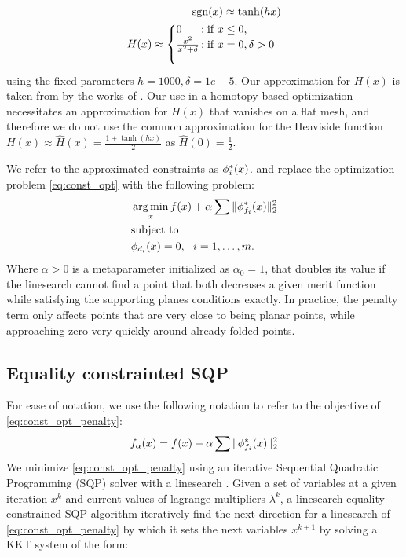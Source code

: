 \begin{align} 
\begin{split}\label{eq:const_inner}
\text{sgn}(x) \approx \tanh(hx) \\
H(x) \approx  \left\{\begin{array}{@{}l@{\thinspace}l}
0  &: \text{if } x \leq 0, \\
\frac{x^2}{x^2+\delta} &: \text{if } x = 0, \delta > 0 \\\\
\end{array}\right.
\end{split}
\end{align}
using the fixed parameters $h=1000,\delta = 1e-5$. Our approximation for $H(x)$ is taken from by the works of \cite{l0_approximation,autocuts}.  Our use in a homotopy based optimization necessitates an approximation for $H(x)$ that vanishes on a flat mesh, and therefore we do not use the common approximation for the Heaviside function $H(x) \approx \hat{H}(x) =  \frac{1+\tanh(hx)}{2}$ as $\hat H(0) = \frac{1}{2}$.

We refer to the approximated constraints as $\phi^*_i(x)$. and replace the optimization problem \eqref{eq:const_opt} with the following problem:
\begin{equation} \label{eq:const_opt_penalty}
\begin{aligned}
& \operatorname*{arg\,min}_x f(x) + \alpha \sum \|\phi^*_{f_i}(x)\|_2^2 \\
& \textrm{subject to} \\
& \phi_{d_i}(x) = 0, \ \  i = 1, \ldots, m. \\ 
\end{aligned}
\end{equation}
Where $\alpha > 0$ is a metaparameter initialized as $\alpha_0 = 1$, that doubles its value if the linesearch cannot find a point that both decreases a given merit function while satisfying the supporting planes conditions exactly. In practice, the penalty term only affects points that are very close to being planar points, while approaching zero very quickly around already folded points.

\subsection{Equality constrainted SQP}
For ease of notation, we use the following notation to refer to the objective of \eqref{eq:const_opt_penalty}:
\begin{equation}
f_\alpha(x) = f(x) + \alpha \sum \|\phi^*_{f_i}(x)\|_2^2
\end{equation}
We minimize \eqref{eq:const_opt_penalty} using an iterative Sequential Quadratic Programming (SQP) solver with a linesearch \cite{nocedal}. Given a set of variables at a given iteration $x^k$ and current values of lagrange multipliers $\lambda^k$, a linesearch equality constrained SQP algorithm iteratively find the next direction for a linesearch of \eqref{eq:const_opt_penalty} by which it sets the next variables $x^{k+1}$ by solving a KKT system of the form:

